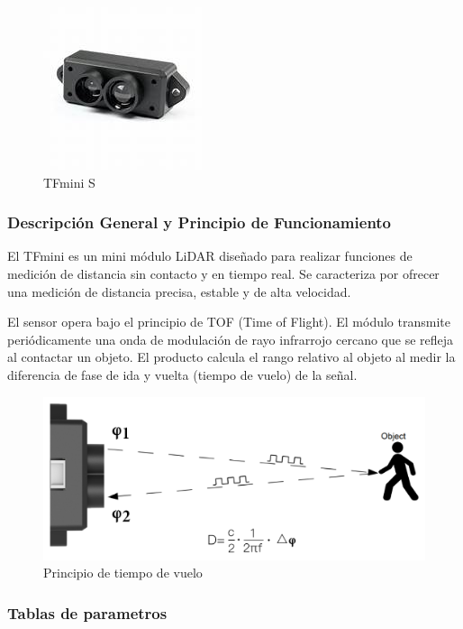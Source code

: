 \documentclass[12pt,a4paper]{article}
\begin{document}
\begin{figure}[H]
    \centering
    \includegraphics[width=0.5\linewidth]{Carpeta tecnica/TFmini.png}
    \caption{TFmini S}
\end{figure}

\subsubsection{Descripción General y Principio de Funcionamiento}

El TFmini es un mini módulo LiDAR diseñado para realizar funciones de medición de distancia sin contacto y en tiempo real. Se caracteriza por ofrecer una medición de distancia precisa, estable y de alta velocidad.

El sensor opera bajo el principio de TOF (Time of Flight). El módulo transmite periódicamente una onda de modulación de rayo infrarrojo cercano que se refleja al contactar un objeto. El producto calcula el rango relativo al objeto al medir la diferencia de fase de ida y vuelta (tiempo de vuelo) de la señal.

\begin{figure}[H]
    \centering
    \includegraphics[width=0.8\linewidth]{Carpeta tecnica/principvuelo.png}
    \caption{Principio de tiempo de vuelo}
    \label{fig:placeholder}
\end{figure}

\subsubsection{Tablas de parametros}
\end{document}
